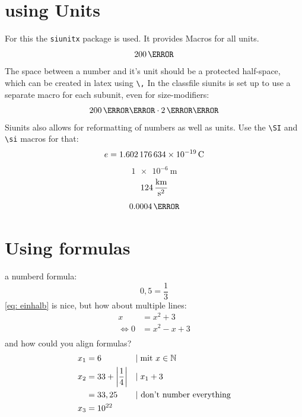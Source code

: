 \documentclass[	%
		fontsize=11pt,  %
		a4paper,	    %
		twoside,		%
		english,		%
		sans,			%
		f1				%
	]{HsH-report}		%
\begin{document}
\section{using Units}
	For this the \lstinline{siunitx} package is used. It provides Macros for all units.
	\begin{equation}
		200\,\kg
	\end{equation}
	The space between a number and it's unit should be a protected half-space, which can be created in latex using \lstinline{\,} In the classfile
	siunits is set up to use a separate macro for each subunit, even for size-modifiers:
	\begin{equation}
		200\,\milli\metre \cdot 2\,\mega\volt
	\end{equation}
	Siunits also allows for reformatting of numbers as well as units. Use the \lstinline{\SI} and \lstinline{\si} macros for that:
	\begin{equation}
		e = \SI{1.602176634E-19}{\coulomb} %
	\end{equation}
	\begin{equation}
		\SI[exponent-to-prefix]{1e-6}{\metre}%
	\end{equation}
	\begin{equation}
		124\,\si[per-mode=fraction]{\kilo\metre\per\second\squared} %
	\end{equation}
	\begin{equation}
		\num{0.0004}\,\lumen %
	\end{equation}

\section{Using formulas}
	\label{sec: formula}
	a numberd formula:
	\begin{equation}
		\label{eq: einhalb} %
		0,5=\frac{1}{3}
	\end{equation}
	\autoref{eq: einhalb} is nice, but how about multiple lines:
	\begin{equation}
	\begin{split} %
		x &= x^2+3 \\
		\Leftrightarrow 0 &= x^2-x+3 \\
	\end{split}
	\end{equation}
	and how could you align formulas?
	\begin{align}
		x_1 &= 6 &&|\;\mbox{mit } x \in \mathbb{N} \\
		x_2 &= 33+\left\vert\frac{1}{4}\right\vert &&|\;x_1+3 \\
			&= 33,25 &&\mbox{| don't number everything} \notag \\
		x_3 &= 10^{22}
	\end{align}
\end{document}
